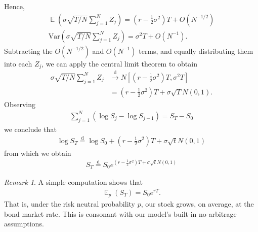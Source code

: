 \documentclass[12pt]{article}
\DeclareMathOperator{\ex}{\mathbb{E}}
\newcommand{\var}{\mathrm{Var}}
\theoremstyle{plain}
\theoremstyle{definition}
\theoremstyle{remark}
\newtheorem*{remark}{Remark}
\numberwithin{equation}{section}  %
\begin{document}
Hence,
\begin{gather*}
	\ex (\sigma \sqrt{T/N} \sum_{j=1}^{N} Z_{j}) =
	\left( r - \frac{1}{2} \sigma^{2} \right) T + O(N^{-1/2})
	\\
	\var (\sigma \sqrt{T/N} \sum_{j=1}^{N} Z_{j}) =
	\sigma^{2}T + O(N^{-1}).
\end{gather*}
Subtracting the $O(N^{-1/2})$  and $O(N^{-1})$ terms, and equally distributing
them into each $Z_{j}$, we can apply the central limit theorem to obtain
\begin{equation*}
	\begin{split}
		\sigma \sqrt{T/N} \sum_{j=1}^{N} Z_{j} 
		& \xrightarrow{\text{d}}
		N \left [\left(r - \frac{1}{2} \sigma^{2} \right )T, \sigma^{2}T \right]
		\\
		& = \left(r - \frac{1}{2} \sigma^{2} \right)T + \sigma \sqrt{T} N(0,1).
	\end{split}
\end{equation*}
Observing 
\begin{equation*}
	\begin{split}
		\sum_{j=1}^{N} \left( \log S_{j} - \log S_{j-1} \right) = S_{T} - S_{0}
	\end{split}
\end{equation*}
we conclude that
\begin{equation*}
	\begin{split}
		\log S_{T} \overset{\text{d}}{=} 
		\log S_{0}  + \left( r - \frac{1}{2} \sigma^{2} \right)T
		+ \sigma \sqrt{t} N(0,1)
	\end{split}
\end{equation*}
from which we obtain
\begin{equation*}
	\begin{split}
		S_{T} \overset{\text{d}}{=} 
		S_{0} e^{\left( r - \frac{1}{2} \sigma^{2} \right)T + \sigma
		\sqrt{t}N(0,1)}
	\end{split}
\end{equation*}
\begin{framed}
	\begin{remark}
		A simple computation shows that
		\begin{equation*}
			\begin{split}
				\ex_{p}(S_{T}) = S_{0}e^{rT}.
			\end{split}
		\end{equation*}
		That is, under the risk neutral probability $p$, our stock grows, on average,
		at the bond market rate. This is consonant with our model's built-in
		no-arbitrage assumptions.
	\end{remark}
\end{framed}
\end{document}
